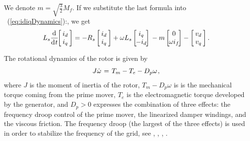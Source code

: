 \documentclass[conference]{IEEEtran}
\newcommand{\BE}{\begin{equation}}
\newcommand{\BEQ}[1]{\BE\label{#1}} %
\newcommand{\rfb}[1]{\mbox{\rm
   (\ref{#1})}\ifx\undefined\stillediting\else:\fbox{$#1$}\fi}
\renewcommand{\o}    {{\omega}}
\newcommand{\m}      {{\hbox{\hskip 1pt}}}
\newcommand{\nm}     {{\hbox{\hskip -3pt}}}
\newcommand{\dd}     {{\rm d\hbox{\hskip 0.5pt}}}
\begin{document}
We denote $m=\sqrt{\frac{3}{2}}M_{f}$. If we substitute the last
formula into \rfb{eq:idiqDynamics}, we get
\BEQ{eq:idiqDynamicsWithExIf}
   L_s\frac{\dd}{\dd t} \nm \left[\nm \begin{array}{c}
   i_d\\ i_q \end{array} \nm\right] = -R_s\left[\nm \begin{array}{c}
   i_d\\ i_q \end{array} \nm\right]+\o L_s\left[\nm\nm \begin{array}
   {c} i_q\\ -i_d\end{array} \nm\nm\right]\\ -m\left[\nm\nm 
   \begin{array}{c} 0\\ \o i_f\end{array} \nm\nm\right] - \left[\nm 
   \begin{array}{c} v_d\\ v_q \end{array} \nm\right] .
\end{equation}

The rotational dynamics of the rotor is given by
\BEQ{eq:mechanicalPart}
   J\dot{\omega} \m=\m T_{m}-T_{e}-D_{p} \omega \m,
\end{equation}
where $J$ is the moment of inertia of the rotor, $T_m-D_p\o$ is is the
mechanical torque coming from the prime mover, $T_e$ is the
electromagnetic torque developed by the generator, and $D_p>0$
expresses the combination of three effects: the frequency droop
control of the prime mover, the linearized damper windings, and the
viscous friction. The frequency droop (the largest of the three
effects) is used in order to stabilize the frequency of the grid, see
\cite{Kundur}, \cite{PoDoBu:13}, \cite{CaTa:14}, \cite{ZhWe:11}.
\end{document}
